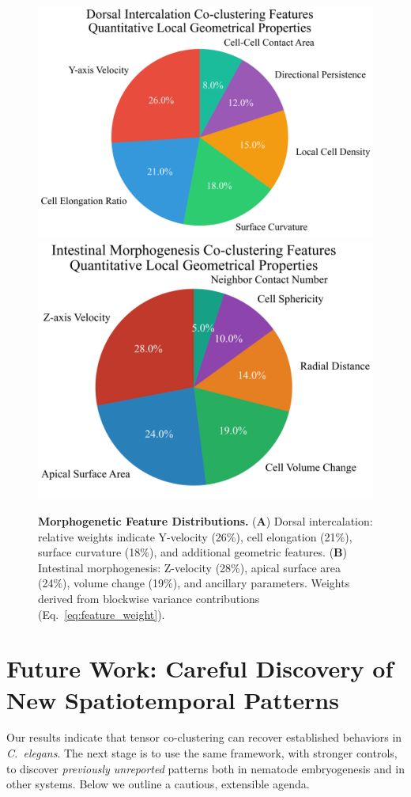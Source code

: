 \documentclass[unnumsec,webpdf,modern,large,namedate]{oup-authoring-template}%
\theoremstyle{thmstyleone}\newtheorem{theorem}{Theorem}
\theoremstyle{thmstyletwo}\newtheorem{example}{Example}
\theoremstyle{thmstylethree}\newtheorem{definition}{Definition}
\begin{document}
\begin{figure}[t]
  \centering
  \includegraphics[width=.48\linewidth]{Demo7A_Dorsal_Coclustering_Features_Pie.png}\hfill
  \includegraphics[width=.48\linewidth]{Demo7B_Intestinal_Coclustering_Features_Pie.png}
  \caption{\textbf{Morphogenetic Feature Distributions.} (\textbf{A}) Dorsal intercalation: relative weights indicate Y-velocity (26\%), cell elongation (21\%), surface curvature (18\%), and additional geometric features. (\textbf{B}) Intestinal morphogenesis: Z-velocity (28\%), apical surface area (24\%), volume change (19\%), and ancillary parameters. Weights derived from blockwise variance contributions (Eq.~\ref{eq:feature_weight}).}
  \label{fig:features}
\end{figure}

\section{Future Work: Careful Discovery of New Spatiotemporal Patterns}
\label{sec:future}

Our results indicate that tensor co-clustering can recover established behaviors in
\textit{C.~elegans}.  The next stage is to use the same framework, with stronger controls,
 to discover \emph{previously unreported} patterns both in nematode embryogenesis and in
 other systems.  Below we outline a cautious, extensible agenda.
\end{document}
